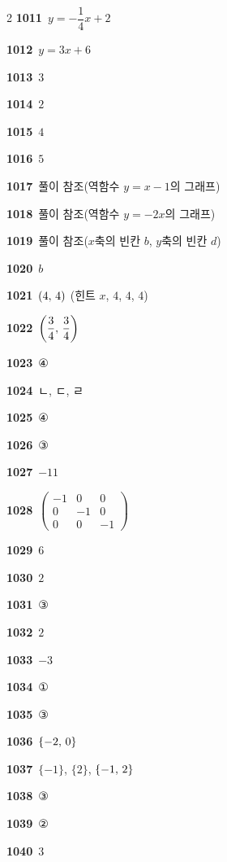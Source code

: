 \documentclass[10pt,a4paper]{article}
\begin{document}
\begin{multicols}{2}
\noindent\textbf{1011}\ $y=-\dfrac{1}{4}x+2$\par
\noindent\textbf{1012}\ $y=3x+6$\par
\noindent\textbf{1013}\ $3$\par
\noindent\textbf{1014}\ $2$\par
\noindent\textbf{1015}\ $4$\par
\noindent\textbf{1016}\ $5$\par
\noindent\textbf{1017}\ 풀이 참조(역함수 $y=x-1$의 그래프)\par
\noindent\textbf{1018}\ 풀이 참조(역함수 $y=-2x$의 그래프)\par
\noindent\textbf{1019}\ 풀이 참조($x$축의 빈칸 $b$, $y$축의 빈칸 $d$)\par
\noindent\textbf{1020}\ $b$\par
\noindent\textbf{1021}\ $(4,\mkern3mu 4)$ (힌트 $x$, $4$, $4$, $4$)\par
\noindent\textbf{1022}\ $\left(\dfrac{3}{4},\mkern3mu \dfrac{3}{4}\right)$\par
\noindent\textbf{1023}\ ④\par
\noindent\textbf{1024}\ ㄴ, ㄷ, ㄹ\par
\noindent\textbf{1025}\ ④\par
\noindent\textbf{1026}\ ③\par
\noindent\textbf{1027}\ $-11$\par
\noindent\textbf{1028}\ $\begin{pmatrix}-1&0&0\\0&-1&0\\0&0&-1\end{pmatrix}$\par
\noindent\textbf{1029}\ $6$\par
\noindent\textbf{1030}\ $2$\par
\noindent\textbf{1031}\ ③\par
\noindent\textbf{1032}\ $2$\par
\noindent\textbf{1033}\ $-3$\par
\noindent\textbf{1034}\ ①\par
\noindent\textbf{1035}\ ③\par
\noindent\textbf{1036}\ $\{-2,\mkern3mu 0\}$\par
\noindent\textbf{1037}\ $\{-1\}$, $\{2\}$, $\{-1,\mkern3mu 2\}$\par
\noindent\textbf{1038}\ ③\par
\noindent\textbf{1039}\ ②\par
\noindent\textbf{1040}\ $3$\par

\end{multicols}
\end{document}
